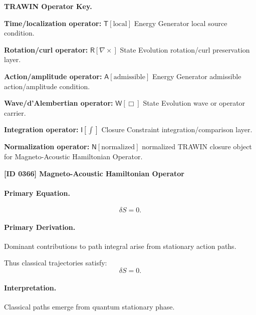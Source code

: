 \par\vspace{0.45\baselineskip}
\noindent\begin{minipage}[t]{\linewidth}
\begingroup
\small
\raggedright
\textbf{TRAWIN Operator Key.}\par
\noindent\textbf{Time/localization operator:} $\mathsf{T}\!\left[\mathrm{local}\right]$ Energy Generator local source condition.\par
\noindent\textbf{Rotation/curl operator:} $\mathsf{R}\!\left[\nabla\times\right]$ State Evolution rotation/curl preservation layer.\par
\noindent\textbf{Action/amplitude operator:} $\mathsf{A}\!\left[\mathrm{admissible}\right]$ Energy Generator admissible action/amplitude condition.\par
\noindent\textbf{Wave/d'Alembertian operator:} $\mathsf{W}\!\left[\Box\right]$ State Evolution wave or operator carrier.\par
\noindent\textbf{Integration operator:} $\mathsf{I}\!\left[\int\right]$ Closure Constraint integration/comparison layer.\par
\noindent\textbf{Normalization operator:} $\mathsf{N}\!\left[\mathrm{normalized}\right]$ normalized TRAWIN closure object for Magneto-Acoustic Hamiltonian Operator.\par
\endgroup
\end{minipage}

\clearpage
\noindent\textbf{[ID 0366] Magneto-Acoustic Hamiltonian Operator}\par
\vspace{0.35em}
\paragraph{Primary Equation.}
\begin{equation}
\delta S = 0.
\end{equation}

\paragraph{Primary Derivation.}
Dominant contributions to path integral arise from stationary action paths.

Thus classical trajectories satisfy:
\begin{equation}
\boxed{\delta S = 0.}
\end{equation}

\paragraph{Interpretation.}
Classical paths emerge from quantum stationary phase.

